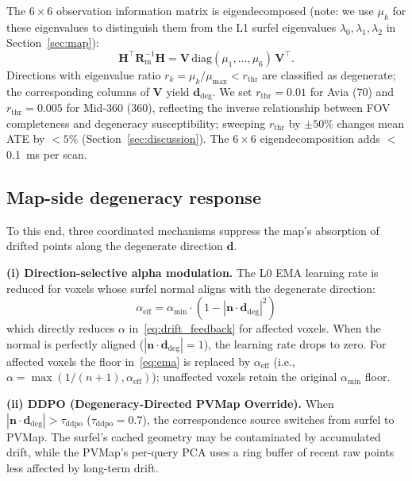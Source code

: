 \documentclass[conference]{IEEEtran}
\newcommand{\bvec}[1]{\mathbf{#1}}
\begin{document}
The $6{\times}6$ observation information matrix is eigendecomposed
(note: we use $\mu_k$ for these eigenvalues to distinguish them from
the L1 surfel eigenvalues $\lambda_0, \lambda_1, \lambda_2$ in
Section~\ref{sec:map}):
\begin{equation}\label{eq:eigen_degen}
  \bvec{H}^\top\bvec{R}_\mathrm{m}^{-1}\bvec{H} = \bvec{V}\,
    \mathrm{diag}(\mu_1, \ldots, \mu_6)\,\bvec{V}^\top.
\end{equation}
Directions with eigenvalue ratio $r_k = \mu_k / \mu_\mathrm{max}
< r_\mathrm{thr}$ are classified as degenerate; the corresponding columns of
$\bvec{V}$ yield $\bvec{d}_\mathrm{deg}$.
We set $r_\mathrm{thr} = 0.01$ for Avia (70\textdegree{}) and
$r_\mathrm{thr} = 0.005$ for Mid-360 (360\textdegree{}), reflecting
the inverse relationship between FOV completeness and degeneracy
susceptibility; sweeping $r_\mathrm{thr}$ by $\pm 50\%$ changes mean
ATE by ${<}5\%$ (Section~\ref{sec:discussion}).
The $6{\times}6$ eigendecomposition adds $<$\SI{0.1}{\milli\second}
per scan.

\subsection{Map-side degeneracy response}
To this end, three coordinated mechanisms suppress the map's absorption
of drifted points along the degenerate direction $\bvec{d}$.

\textbf{(i) Direction-selective alpha modulation.}
The L0 EMA learning rate is reduced for voxels whose surfel normal aligns
with the degenerate direction:
\begin{equation}\label{eq:alpha_mod}
  \alpha_\mathrm{eff} = \alpha_\mathrm{min} \cdot
    (1 - |\bvec{n} {\cdot} \bvec{d}_\mathrm{deg}|^2)
\end{equation}
which directly reduces $\alpha$ in~\eqref{eq:drift_feedback} for affected
voxels. When the normal is perfectly aligned ($|\bvec{n} \cdot
\bvec{d}_\mathrm{deg}| = 1$), the learning rate drops to zero. For
affected voxels the floor in~\eqref{eq:ema} is replaced by
$\alpha_\mathrm{eff}$ (i.e., $\alpha{=}\max(1/(n{+}1),\alpha_\mathrm{eff})$);
unaffected voxels retain the original $\alpha_\mathrm{min}$ floor.

\textbf{(ii) DDPO (Degeneracy-Directed PVMap Override).}
When $|\bvec{n} \cdot \bvec{d}_\mathrm{deg}| > \tau_\mathrm{ddpo}$
($\tau_\mathrm{ddpo}{=}0.7$), the
correspondence source switches from surfel to PVMap. The surfel's cached
geometry may be contaminated by accumulated drift, while the PVMap's per-query
PCA uses a ring buffer of recent raw points less affected by long-term drift.
\end{document}
